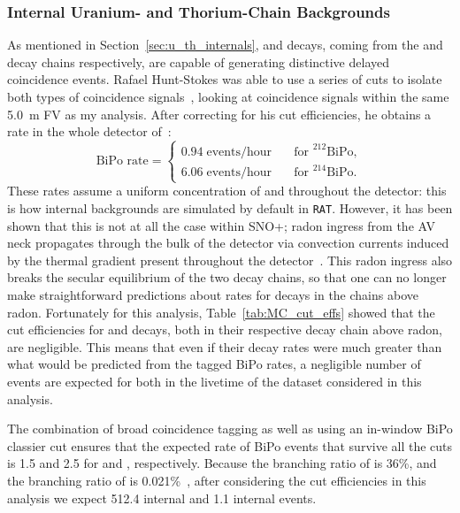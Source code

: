 \subsubsection{Internal Uranium- and Thorium-Chain Backgrounds}
As mentioned in Section~\ref{sec:u_th_internals},  and  decays, coming from the  and  decay chains respectively, are capable of generating distinctive delayed coincidence events. Rafael Hunt-Stokes was able to use a series of cuts to isolate both types of coincidence signals~\cite{}, %
looking at coincidence signals within the same \SI{5.0}{\m} FV as my analysis. After correcting for his cut efficiencies, he obtains a rate in the whole detector of~\cite{}: %
\begin{equation*}
    \text{BiPo rate} = 
    \begin{cases}
        0.94\; \text{events/hour} & \quad \text{for } ^{212}\text{BiPo},\\
        6.06\; \text{events/hour} & \quad \text{for } ^{214}\text{BiPo}.
    \end{cases}
\end{equation*}
These rates assume a uniform concentration of  and  throughout the detector: this is how internal backgrounds are simulated by default in \texttt{RAT}. However, it has been shown that this is not at all the case within SNO+; radon ingress from the AV neck propagates through the bulk of the detector via convection currents induced by the thermal gradient present throughout the detector~\cite{}. %
This radon ingress also breaks the secular equilibrium of the two decay chains, so that one can no longer make straightforward predictions about rates for decays in the chains above radon. Fortunately for this analysis, Table~\ref{tab:MC_cut_effs} showed that the cut efficiencies for  and  decays, both in their respective decay chain above radon, are negligible. This means that even if their decay rates were much greater than what would be predicted from the tagged BiPo rates, a negligible number of events are expected for both in the livetime of the dataset considered in this analysis.

The combination of broad coincidence tagging as well as using an in-window BiPo classier cut ensures that the expected rate of BiPo events that survive all the cuts is 1.5 and 2.5 for  and , respectively. Because the branching ratio of  is 36\%, and the branching ratio of  is 0.021\%~\cite{}, %
after considering the cut efficiencies in this analysis we expect 512.4 internal  and 1.1 internal  events.

